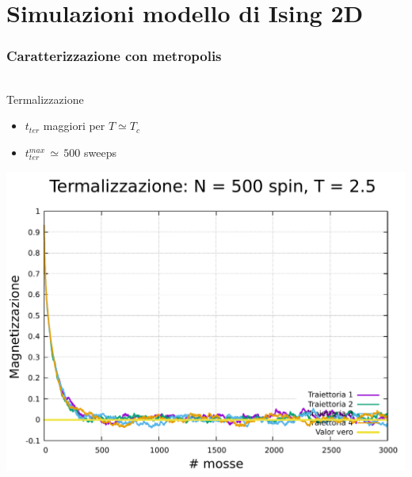 \section{Simulazioni modello di Ising 2D}

\begin{frame}
    \frametitle{Caratterizzazione con metropolis}
    \framesubtitle{}

    \begin{columns}
        \begin{column}{0.33\textwidth}
            \begin{block}{Termalizzazione}

                \begin{itemize}[itemsep=0.5em, label=$\diamond$]
                    \item $t_{ter}$ maggiori per $T \simeq T_c$
                    \item $t_{ter}^{max}\,\simeq\,500$ sweeps
                \end{itemize}

                \vspace{0.5cm}

                \centering
                \includegraphics[width=\textwidth]{Immagini/simIsing2D/term_500_2.5.pdf}
            
            \end{block}
        \end{column}
    

\end{columns}
\end{frame}
